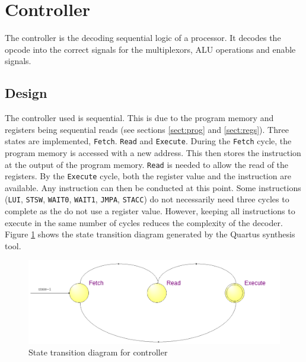 

\section{Controller}\label{sect:controller}

The controller is the decoding sequential logic of a processor. 
It decodes the opcode into the correct signals for the multiplexors, ALU operations and enable signals.


\subsection{Design}

The controller used is sequential. 
This is due to the program memory and registers being sequential reads (see sections \ref{sect:prog} and \ref{sect:regs}).
Three states are implemented, \texttt{Fetch}. \texttt{Read} and \texttt{Execute}. 
During the \texttt{Fetch} cycle, the program memory is accessed with a new address. 
This then stores the instruction at the output of the program memory. 
\texttt{Read} is needed to allow the read of the registers. 
By the \texttt{Execute} cycle, both the register value and the instruction are available. 
Any instruction can then be conducted at this point.
Some instructions (\texttt{LUI}, \texttt{STSW}, \texttt{WAIT0}, \texttt{WAIT1}, \texttt{JMPA}, \texttt{STACC}) do not necessarily need three cycles to complete as the do not use a register value.
However, keeping all instructions to execute in the same number of cycles reduces the complexity of the decoder. 
Figure \ref{fig:controllerasm} shows the state transition diagram generated by the Quartus synthesis tool.

\begin{figure}
\includegraphics[width=\textwidth]{Figures/cpu_control_state.png}
\caption{State transition diagram for controller}
\label{fig:controllerasm}
\end{figure}

